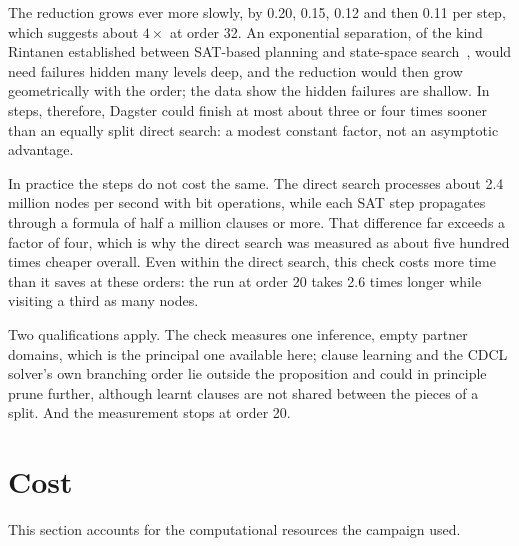 \documentclass[11pt,a4paper]{article}
\theoremstyle{definition}
\begin{document}
The reduction grows ever more slowly, by 0.20, 0.15, 0.12 and then 0.11 per step, which suggests
about $4\times$ at order 32. An exponential separation, of the kind Rintanen established between
SAT-based planning and state-space search~\cite{rintanen2012}, would need failures hidden many levels deep, and the
reduction would then grow geometrically with the order; the data show the hidden failures are
shallow. In steps, therefore, Dagster could finish at most about three or four times sooner than
an equally split direct search: a modest constant factor, not an asymptotic advantage.

In practice the steps do not cost the same. The direct search processes about 2.4 million nodes
per second with bit operations, while each SAT step propagates through a formula of half a million
clauses or more. That difference far exceeds a factor of four, which is why the direct search was
measured as about five hundred times cheaper overall. Even within the direct search, this check
costs more time than it saves at these orders: the run at order 20 takes 2.6 times longer while
visiting a third as many nodes.

Two qualifications apply. The check measures one inference, empty partner domains, which is the
principal one available here; clause learning and the CDCL solver's own branching order lie outside
the proposition and could in principle prune further, although learnt clauses are not shared
between the pieces of a split. And the measurement stops at order 20.


\section{Cost}\label{sec:cost}
This section accounts for the computational resources the campaign used.

\end{document}
